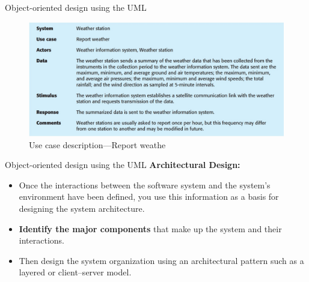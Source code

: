 \documentclass{beamer}
\begin{document}
\begin{frame}{Object-oriented design using the UML}
		\begin{figure}
			\includegraphics[scale=.4]{img/m3_3}
			\caption{Use case 
				description—Report 
				weathe
			}
		\end{figure}
\end{frame}

\begin{frame}{Object-oriented design using the UML}
	\textbf{Architectural Design:}
\begin{itemize}
	\item Once the interactions between the software system and the system’s 
	environment have been defined, you use this information as a basis 
	for designing the system architecture.
	\item \textbf{Identify the major components }that make up the system and their 
	interactions. 
	\item Then design the system organization using an architectural pattern 
	such as a layered or client–server model.

\end{itemize}
\end{frame}
\end{document}
